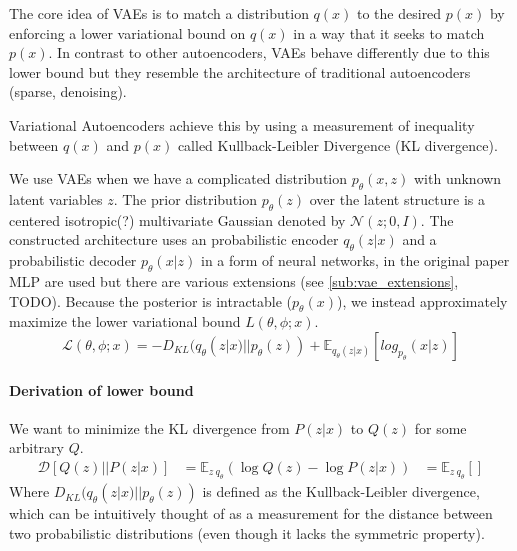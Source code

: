 \documentclass[twoside,11pt,a4paper]{article}
\theoremstyle{break}
\begin{document}
The core idea of VAEs is to match a distribution $q(x)$ to the desired $p(x)$ by enforcing a lower variational bound on $q(x)$ in a way that it seeks to match $p(x)$.
In contrast to other autoencoders, VAEs behave differently due to this lower bound but they resemble the architecture of traditional autoencoders (sparse, denoising).



Variational Autoencoders achieve this by using a measurement of inequality between $q(x)$ and $p(x)$ called Kullback-Leibler Divergence (KL divergence).


We use VAEs when we have a complicated distribution $p_\theta(x,z)$ with unknown latent variables $z$.
The prior distribution $p_\theta(z)$ over the latent structure is a centered isotropic(?) multivariate Gaussian denoted by $\mathcal{N}(z;0, I)$.
The constructed architecture uses an probabilistic encoder $q_\theta(z|x)$ and a probabilistic decoder $p_\theta(x|z)$ in a form of neural networks, in the original paper MLP are used\cite{vae:2013} but there are various extensions (see \ref{sub:vae_extensions}, TODO).
Because the posterior is intractable ($p_\theta(x)$), we instead approximately maximize the lower variational bound $L(\theta,\phi;x)$.\\
\begin{equation}
  \mathcal{L}(\theta,\phi;x) = -D_{KL}(q_\theta(z|x)||p_\theta(z)) + \mathbb{E}_{q_\theta(z|x)}[log_{p_\theta}(x|z)]
\end{equation}
\paragraph{Derivation of lower bound}
We want to minimize the KL divergence from $P(z|x)$ to $Q(z)$ for some arbitrary $Q$.
  \begin{align*}
    \label{eq:der_lower_bound}
    \mathcal{D}[Q(z)||P(z|x)] &= \mathbb{E}_{z~q_\theta}(\log Q(z) - \log P(z|x))
    &= \mathbb{E}_{z ~ q_\theta}[]
  \end{align*}
Where $D_{KL}(q_\theta(z|x) || p_\theta(z))$ is defined as the Kullback-Leibler divergence, which can be intuitively thought of as a measurement for the distance between two probabilistic distributions (even though it lacks the symmetric property).
\end{document}
